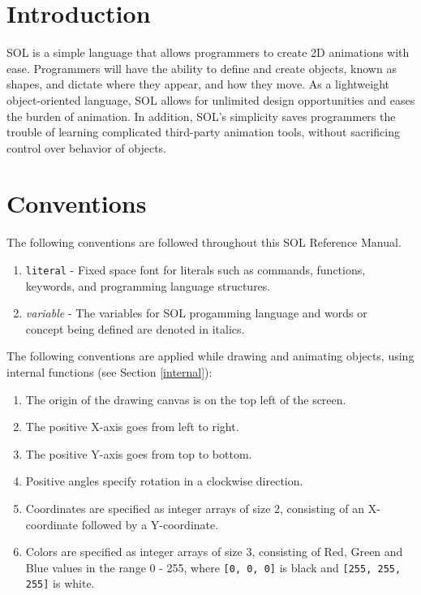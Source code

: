 
\section{Introduction}
SOL is a simple language that allows programmers to create 2D animations with ease. Programmers will have the ability to define and create objects, known as shapes, and dictate where they appear, and how they move. As a lightweight object-oriented language, SOL allows for unlimited design opportunities and eases the burden of animation. In addition, SOL’s simplicity saves programmers the trouble of learning complicated third-party animation tools, without sacrificing control over behavior of objects.
\par

\section{Conventions}
    The following conventions are followed throughout this SOL Reference Manual.

    \begin{enumerate}
        \itemsep0em
        \item \texttt{literal} - Fixed space font for literals such as commands, functions,\\
        \hspace*{4.4em} keywords, and programming language structures.
        
        \item \textit{variable} - The variables for SOL progamming language and words or\\
        \hspace*{4.4em} concept being defined are denoted in italics.
    \end{enumerate}

    The following conventions are applied while drawing and animating objects, using internal functions (see Section \ref{internal}):

    \begin{enumerate}
        \itemsep0em
        \item The origin of the drawing canvas is on the top left of the screen.
        \item The positive X-axis goes from left to right.
        \item The positive Y-axis goes from top to bottom.
        \item Positive angles specify rotation in a clockwise direction.
        \item Coordinates are specified as integer arrays of size 2, consisting of an X-coordinate followed by a Y-coordinate.
        \item Colors are specified as integer arrays of size 3, consisting of Red, Green and Blue values in the range 0 - 255, where \texttt{[0, 0, 0]} is black and \texttt{[255, 255, 255]} is white.
    \end{enumerate}

